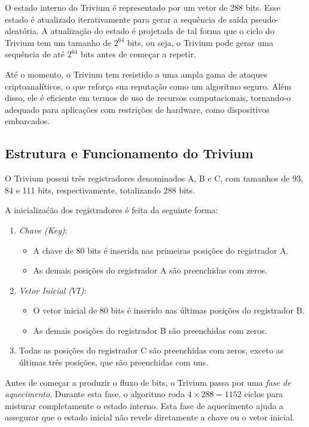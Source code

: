O estado interno do Trivium é representado por um vetor de 288 bits.
Esse estado é atualizado iterativamente para gerar a sequência de saída pseudo-aleatória.
A atualização do estado é projetada de tal forma que o ciclo do Trivium tem um tamanho de $2^{64}$ bits, ou seja, o Trivium pode gerar uma sequência de até $2^{64}$ bits antes de começar a repetir.

Até o momento, o Trivium tem resistido a uma ampla gama de ataques criptoanalíticos, o que reforça sua reputação como um algoritmo seguro.
Além disso, ele é eficiente em termos de uso de recursos computacionais, tornando-o adequado para aplicações com restrições de hardware, como dispositivos embarcados.

\subsection*{Estrutura e Funcionamento do Trivium}

O Trivium possui três registradores denominados A, B e C, com tamanhos de 93, 84 e 111 bits, respectivamente, totalizando 288 bits.

A inicializaćão dos registradores é feita da seguinte forma:

\begin{enumerate}
\item {\em Chave (Key)}:
  \begin{itemize}
  \item A chave de 80 bits é inserida nas primeiras posições do registrador A.
  \item As demais posições do registrador A são preenchidas com zeros.
  \end{itemize}
  
\item {\em Vetor Inicial ($VI$)}:
  \begin{itemize}
  \item O vetor inicial de 80 bits é inserido nas últimas posições do registrador B.
  \item As demais posições do registrador B são preenchidas com zeros.
  \end{itemize}
    
\item Todas as posições do registrador C são preenchidas com zeros, exceto as últimas três posições, que são preenchidas com uns.    
\end{enumerate}

Antes de começar a produzir o fluxo de bits, o Trivium passa por uma {\em fase de aquecimento}.
Durante esta fase, o algoritmo roda $4 \times 288 = 1152$ ciclos para misturar completamente o estado interno.
Esta fase de aquecimento ajuda a assegurar que o estado inicial não revele diretamente a chave ou o vetor inicial.

